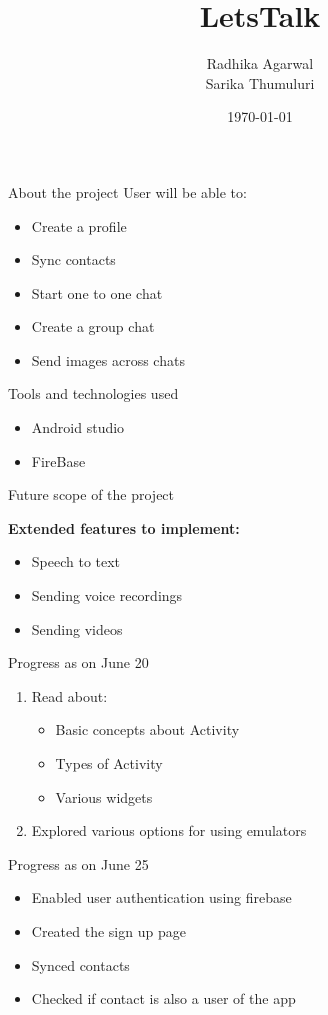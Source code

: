 \documentclass{beamer}
\title{LetsTalk}
\author{Radhika Agarwal\\
 Sarika Thumuluri}
\date{\today}
\begin{document}
\maketitle



\begin{frame}{About the project}
User will be able to:
\begin{itemize}
\item Create a profile
\item Sync contacts
\item Start one to one chat
\item Create a group chat
\item Send images across chats
\end{itemize}

\end{frame}

\begin{frame}{Tools and technologies used}
\begin{itemize}
\item Android studio
\item FireBase
\end{itemize}
\end{frame}

\begin{frame}{Future scope of the project}

\textbf{Extended features to implement:}\newline
\begin{itemize}
\item Speech to text
\item Sending voice recordings
\item Sending videos
\end{itemize}
\end{frame}

 \begin{frame}{Progress as on June 20}
\begin{enumerate}
\item Read about:
\begin{itemize}
\item Basic concepts about Activity
\item Types of Activity
\item Various widgets
\end{itemize}
\item Explored various options for using emulators
\end{enumerate}

\end{frame}
\begin{frame}{Progress as on June 25}
\begin{itemize}
\item Enabled user authentication using firebase
\item Created the sign up page
\item Synced contacts
\item Checked if contact is also a user of the app
\end{itemize}
\end{frame}
\end{document}
